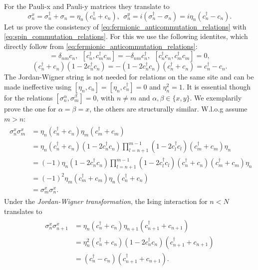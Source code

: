 For the Pauli-x and Pauli-y matrices they translate to
\begin{equation}
	\sigma^x_n = \sigma_n^{\dagger} + \sigma_n = \eta_n (c_n^{\dagger} + c_n), \:\: \sigma^y_n = i(\sigma_n^{\dagger} - \sigma_n) = i\eta_n (c_n^{\dagger} - c_n).
\end{equation}
Let us prove the consistency of \eqref{eq:fermionic_anticommutation_relations} with \eqref{eq:spin_commutation_relations}.	For this we use the following identites, which directly follow from \eqref{eq:fermionic_anticommutation_relations}:
\begin{equation}
[c_n, c_m^{\dagger}c_m] = \delta_{nm}c_n, \:\: [c_n^{\dagger}, c_m^{\dagger}c_m] = -\delta_{nm}c_n^{\dagger}, \:\: [c_n^{\dagger}c_n, c_m^{\dagger}c_m] = 0,
\end{equation}
\begin{equation}
	(c_n^{\dagger} + c_n)(1 - 2c_n^{\dagger}c_n) = -(1 - 2c_n^{\dagger}c_n)(c_n^{\dagger} + c_n) = c_n^{\dagger} - c_n.
\end{equation}
The Jordan-Wigner string is not needed for relations on the same site and can be made ineffective using $[\eta_n, c_n] = [\eta_n, c_n^{\dagger}] = 0$ and $\eta_n^2 = 1$. It is essential though for the relations $[\sigma^{\alpha}_n, \sigma^{\beta}_m] = 0$, with $n \neq m$ and $\alpha, \beta \in \{x, y\}$. We exemplarily prove the one for $\alpha = \beta = x$, the others are structurally similar. W.l.o.g assume $m > n$:
\begin{align}
\begin{split}
	\sigma^x_n \sigma^x_m &= \eta_n (c_n^{\dagger} + c_n) \eta_m (c_m^{\dagger} + c_m) \\
	&= \eta_n(c_n^{\dagger} + c_n)(1 - 2c_n^{\dagger}c_n) \prod_{l=n+1}^{m-1}(1 - 2c_l^{\dagger}c_l) (c_m^{\dagger} + c_m)\eta_n \\
	&= (-1)\eta_n(1 - 2c_n^{\dagger}c_n) \prod_{l=n+1}^{m-1}(1 - 2c_l^{\dagger}c_l)(c_n^{\dagger} + c_n)(c_m^{\dagger} + c_m)\eta_n \\
	&= (-1)^2\eta_m (c_m^{\dagger} + c_m) \eta_n (c_n^{\dagger} + c_n) \\
	&= \sigma^x_m \sigma^x_n.
\end{split}
\end{align}
Under the \textit{Jordan-Wigner transformation}, the Ising interaction for $n < N$ translates to
\begin{align} \label{eq:spin_to_fermions_x}
\begin{split}
	\sigma^x_n \sigma^x_{n+1} &= \eta_n (c_n^{\dagger} + c_n) \eta_{n+1} (c_{n+1}^{\dagger} + c_{n+1}) \\
	&= \eta_n^2 (c_n^{\dagger} + c_n)(1 - 2c_n^{\dagger}c_n)(c_{n+1}^{\dagger} + c_{n+1}) \\
	&= (c_n^{\dagger} - c_n)(c_{n+1}^{\dagger} + c_{n+1}).
\end{split}
\end{align}
